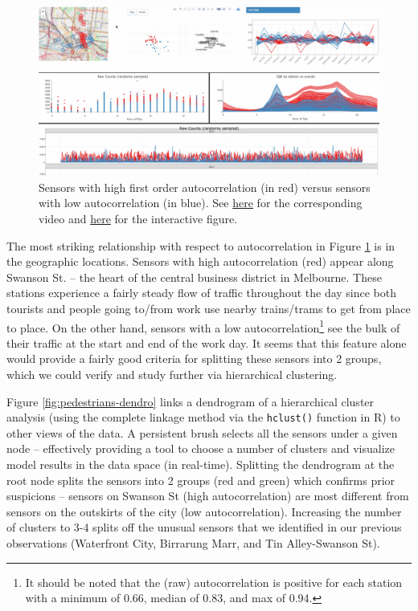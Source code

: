 \documentclass[12pt,]{article}
\let\rmarkdownfootnote\footnote%
\def\footnote{\protect\rmarkdownfootnote}
\theoremstyle{definition}
\theoremstyle{definition}
\theoremstyle{remark}
\begin{document}
\begin{figure}
\centering
\includegraphics{images/pedestrians-cog-tour-acf.pdf}
\caption{\label{fig:pedestrians-cog-tour-acf}Sensors with high first order
autocorrelation (in red) versus sensors with low autocorrelation (in
blue). See \href{https://vimeo.com/189187319}{here} for the
corresponding video and
\href{http://cpsievert.github.io/pedestrians/cog-tour/}{here} for the
interactive figure.}
\end{figure}

The most striking relationship with respect to autocorrelation in Figure
\ref{fig:pedestrians-cog-tour-acf} is in the geographic locations.
Sensors with high autocorrelation (red) appear along Swanson St. -- the
heart of the central business district in Melbourne. These stations
experience a fairly steady flow of traffic throughout the day since both
tourists and people going to/from work use nearby trains/trams to get
from place to place. On the other hand, sensors with a low
autocorrelation\footnote{It should be noted that the (raw)
  autocorrelation is positive for each station with a minimum of 0.66,
  median of 0.83, and max of 0.94.} see the bulk of their traffic at the
start and end of the work day. It seems that this feature alone would
provide a fairly good criteria for splitting these sensors into 2
groups, which we could verify and study further via hierarchical
clustering.

Figure \ref{fig:pedestrians-dendro} links a dendrogram of a hierarchical
cluster analysis (using the complete linkage method via the
\texttt{hclust()} function in R) to other views of the data. A
persistent brush selects all the sensors under a given node --
effectively providing a tool to choose a number of clusters and
visualize model results in the data space (in real-time). Splitting the
dendrogram at the root node splits the sensors into 2 groups (red and
green) which confirms prior suspicions -- sensors on Swanson St (high
autocorrelation) are most different from sensors on the outskirts of the
city (low autocorrelation). Increasing the number of clusters to 3-4
splits off the unusual sensors that we identified in our previous
observations (Waterfront City, Birrarung Marr, and Tin Alley-Swanson
St).
\end{document}
